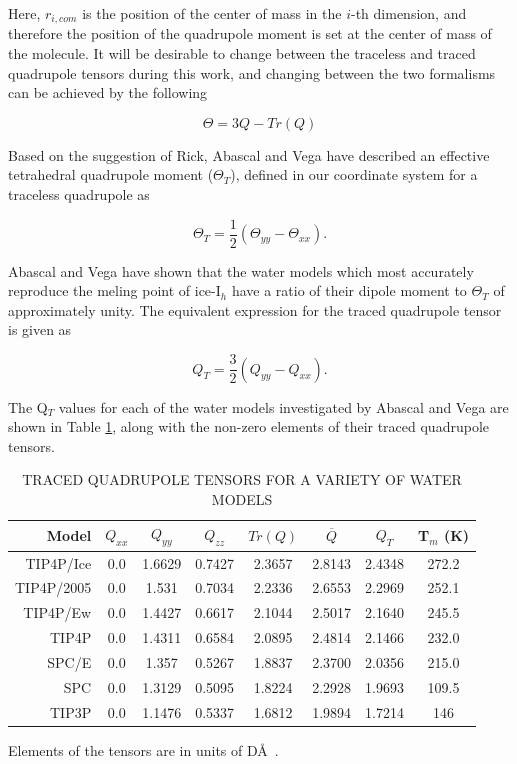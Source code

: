 Here, $r_{i,com}$ is the position of the center of mass in the $i$-th 
dimension, and therefore the position of the quadrupole moment is set at the 
center of mass of the molecule. It will be desirable to change between the
traceless and traced quadrupole tensors during this work, and changing 
between the two formalisms can be achieved by the following

\begin{equation}
\Theta = 3Q - Tr(Q)
\end{equation}    

Based on the suggestion of Rick\cite{Rick2004}, Abascal and Vega have
described an effective tetrahedral quadrupole moment ($\Theta_T$),
defined in our coordinate system for a traceless quadrupole as

\begin{equation}
\Theta_{T} = \frac{1}{2}(\Theta_{yy} - \Theta_{xx}).
\end{equation} 

Abascal and Vega have shown that the water models which most accurately
reproduce the meling point of ice-I$_h$ have a ratio of their dipole moment
to $\Theta_T$ of approximately unity. The equivalent expression for the 
traced quadrupole tensor is given as

\begin{equation}
Q_{T} = \frac{3}{2}(Q_{yy} - Q_{xx}).
\end{equation}
 
The Q$_T$ values for each of the water models
investigated by Abascal and Vega are shown in Table \ref{Models_quad}, along 
with the non-zero elements of their traced quadrupole tensors.

\begin{table}[h!]
\caption{TRACED QUADRUPOLE TENSORS FOR A VARIETY OF WATER MODELS}
\label{Models_quad}
\begin{tabular}{rccccccc}
\hline\hline
Model & $Q_{xx}$ & $Q_{yy}$ & $Q_{zz}$ & $Tr(Q)$ & $\overline{Q}$ & $Q_{T}$ &
                                                                    T$_{m}$ (K) \\
\hline 
TIP4P/Ice & 0.0 & 1.6629 & 0.7427 & 2.3657 & 2.8143 & 2.4348  & 272.2 \\
TIP4P/2005 & 0.0 & 1.531 & 0.7034 & 2.2336 & 2.6553 & 2.2969  & 252.1 \\
TIP4P/Ew & 0.0 & 1.4427 & 0.6617 & 2.1044  & 2.5017 & 2.1640  & 245.5   \\
TIP4P & 0.0 & 1.4311 & 0.6584 & 2.0895 & 2.4814 & 2.1466 & 232.0 \\
SPC/E & 0.0 & 1.357 & 0.5267 & 1.8837 & 2.3700 & 2.0356 & 215.0 \\
SPC & 0.0 & 1.3129 & 0.5095 & 1.8224 & 2.2928 & 1.9693 & 109.5 \\
TIP3P & 0.0 & 1.1476 & 0.5337 & 1.6812 & 1.9894 & 1.7214 & 146 \\
\hline \hline
\end{tabular}
\begin{flushleft}
Elements of the tensors are in units of D\AA~. \\
\end{flushleft}
\end{table} 

